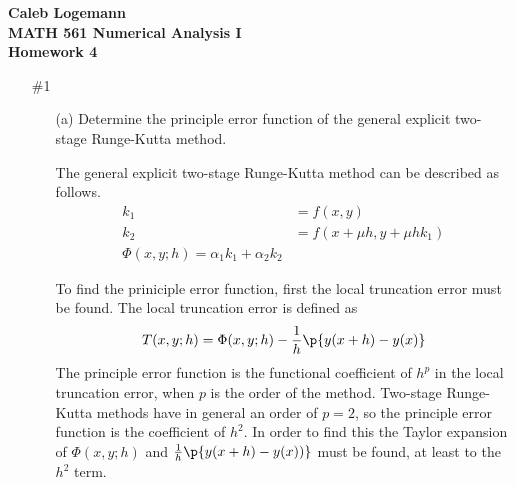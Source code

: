 \documentclass[11pt]{article}
\begin{document}
\noindent \textbf{\Large{Caleb Logemann \\
MATH 561 Numerical Analysis I \\
Homework 4
}}

\begin{enumerate}
    \item[\#1]
        \begin{itemize}
            \item[(a)]
                Determine the principle error function of the general explicit
                two-stage Runge-Kutta method.

                The general explicit two-stage Runge-Kutta method can be
                described as follows.
                \begin{align*}
                    k_1 &= f(x,y) \\
                    k_2 &= f(x + \mu h, y + \mu h k_1) \\
                    \Phi(x, y; h) = \alpha_1 k_1 + \alpha_2 k_2
                \end{align*}

                To find the priniciple error function, first the local
                truncation error must be found.
                The local truncation error is defined as
                \[
                    T(x, y; h) = \Phi(x, y; h) - \frac{1}{h}\p{y(x + h) - y(x)}
                \]
                The principle error function is the functional coefficient of $h^p$
                in the local truncation error, when $p$ is the order of the method.
                Two-stage Runge-Kutta methods have in general an order of $p = 2$,
                so the principle error function is the coefficient of $h^2$.
                In order to find this the Taylor expansion of $\Phi(x, y; h)$ and
                $\frac{1}{h}\p{y(x + h) - y(x))}$ must be found, at least to the 
                $h^2$ term.


\end{itemize}
\end{enumerate}
\end{document}
